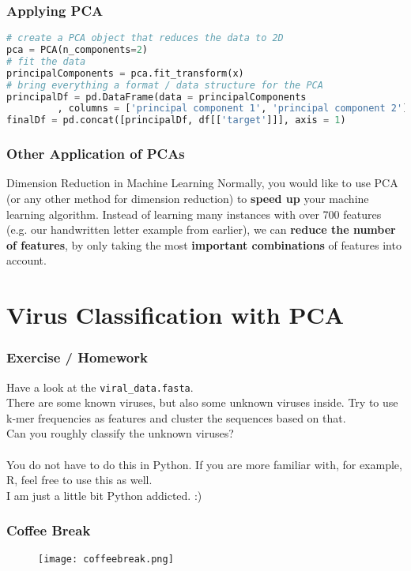 \begin{frame}[c, fragile]\frametitle{Applying PCA}
  \begin{lstlisting}[language=Python, showstringspaces=false]
# create a PCA object that reduces the data to 2D 
pca = PCA(n_components=2)
# fit the data
principalComponents = pca.fit_transform(x)
# bring everything a format / data structure for the PCA
principalDf = pd.DataFrame(data = principalComponents
         , columns = ['principal component 1', 'principal component 2'])
finalDf = pd.concat([principalDf, df[['target']]], axis = 1)
  \end{lstlisting}
\end{frame}

\begin{frame}[c]\frametitle{Other Application of PCAs}
  \begin{block}{Dimension Reduction in Machine Learning}
    Normally, you would like to use PCA (or any other method for dimension reduction) to \textbf{speed up}
    your machine learning algorithm.
    Instead of learning many instances with over 700 features (e.g. our handwritten letter example from earlier),
    we can \textbf{reduce the number of features}, by only taking the most \textbf{important combinations} of features into account.
  \end{block}
\end{frame}

\section[Classification]{Virus Classification with PCA}

\begin{frame}[c]\frametitle{Exercise / Homework}
  \begin{block}{}
  Have a look at the \texttt{viral\_data.fasta}.\\
  There are some known viruses, but also some unknown viruses inside. Try to use k-mer frequencies as features 
  and cluster the sequences based on that.\\Can you roughly classify the unknown viruses?\\ \ \\
  {\tiny You do not have to do this in Python. If you are more familiar with, for example, R, feel free to use this as well.\\
  I am just a little bit Python addicted. :)}
  \end{block}
\end{frame}


\beginbackup

\begin{frame}[c]\frametitle{Coffee Break}
  \begin{figure}[htbp]
    \centering
    \texttt{[image: coffeebreak.png]}
  \end{figure}
\end{frame}

\backupend

